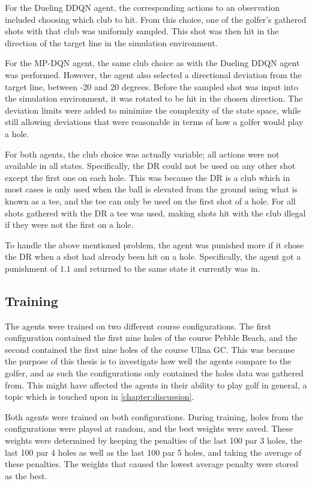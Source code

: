 \documentclass{kththesis}
\begin{document}
For the Dueling DDQN agent, the corresponding actions to an observation included choosing which club to hit. From this choice, one of the golfer's gathered shots with that club was uniformly sampled. This shot was then hit in the direction of the target line in the simulation environment.

For the MP-DQN agent, the same club choice as with the Dueling DDQN agent was performed. However, the agent also selected a directional deviation from the target line, between -20 and 20 degrees. Before the sampled shot was input into the simulation environment, it was rotated to be hit in the chosen direction. The deviation limits were added to minimize the complexity of the state space, while still allowing deviations that were reasonable in terms of how a golfer would play a hole.

For both agents, the club choice was actually variable; all actions were not available in all states. Specifically, the DR could not be used on any other shot except the first one on each hole. This was because the DR is a club which in most cases is only used when the ball is elevated from the ground using what is known as a tee, and the tee can only be used on the first shot of a hole. For all shots gathered with the DR a tee was used, making shots hit with the club illegal if they were not the first on a hole.

To handle the above mentioned problem, the agent was punished more if it chose the DR when a shot had already been hit on a hole. Specifically, the agent got a punishment of $1.1$ and returned to the same state it currently was in. 

\subsection{Training}
\label{sec:rltraining}
The agents were trained on two different course configurations. The first configuration contained the first nine holes of the course Pebble Beach, and the second contained the first nine holes of the course Ullna GC. This was because the purpose of this thesis is to investigate how well the agents compare to the golfer, and as such the configurations only contained the holes data was gathered from. This might have affected the agents in their ability to play golf in general, a topic which is touched upon in \autoref{chapter:discussion}.

Both agents were trained on both configurations. During training, holes from the configurations were played at random, and the best weights were saved. These weights were determined by keeping the penalties of the last 100 par 3 holes, the last 100 par 4 holes as well as the last 100 par 5 holes, and taking the average of these penalties. The weights that caused the lowest average penalty were stored as the best.
\end{document}
